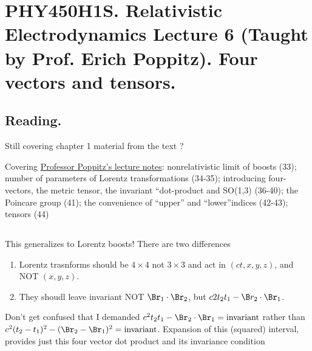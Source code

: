 
%

\chapter{PHY450H1S.  Relativistic Electrodynamics Lecture 6 (Taught by Prof. Erich Poppitz).  Four vectors and tensors.}
\label{chap:relativisticElectrodynamicsL6}
{}
\date{Jan 25, 2011}

\beginArtNoToc

\section{Reading.}

Still covering chapter 1 material from the text \cite{landau1980classical}?

Covering \href{http://www.physics.utoronto.ca/~poppitz/e-poppitz/PHY450_files/RelEM27-44.pdf}{Professor Poppitz's lecture notes}: nonrelativistic limit of boosts (33); number of parameters of Lorentz transformations (34-35); introducing four-vectors, the metric tensor, the invariant ``dot-product and SO(1,3) (36-40); the Poincare group (41); the convenience of ``upper'' and ``lower''indices (42-43); tensors (44) 

\section{}

This generalizes to Lorentz boosts!  There are two differences

\begin{enumerate}
\item Lorentz trasnforms should be $4 \times 4$ not $3 \times 3$ and act in $(ct, x, y, z)$, and NOT $(x,y,z)$.
\item They shoudl leave invariant NOT $\Br_1 \cdot \Br_2$, but $c2 t_2 t_1 - \B r_2 \cdot \Br_1$.
\end{enumerate}

Don't get confused that I demanded $c^2 t_2 t_1 - \Br_2 \cdot \Br_1 = \text{invariant}$ rather than $c^2 (t_2 - t_1)^2 - (\Br_2 - \Br_1)^2 = \text{invariant}$.  Expansion of this (squared) interval, provides just this four vector dot product and its invariance condition

